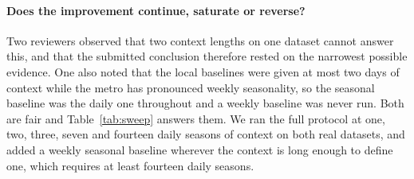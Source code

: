 \documentclass[11pt]{article}
\theoremstyle{plain}
\theoremstyle{definition}
\theoremstyle{remark}
\newif\ifrevisionmarkup
\newcommand{\new}[1]{\ifrevisionmarkup\textcolor{revision}{#1}\else#1\fi}
\begin{document}
\new{\paragraph{Does the improvement continue, saturate or reverse?} Two reviewers observed that two context lengths on one dataset cannot answer this, and that the submitted conclusion therefore rested on the narrowest possible evidence. One also noted that the local baselines were given at most two days of context while the metro has pronounced weekly seasonality, so the seasonal baseline was the daily one throughout and a weekly baseline was never run. Both are fair and Table~\ref{tab:sweep} answers them. We ran the full protocol at one, two, three, seven and fourteen daily seasons of context on both real datasets, and added a weekly seasonal baseline wherever the context is long enough to define one, which requires at least fourteen daily seasons.}
\end{document}
